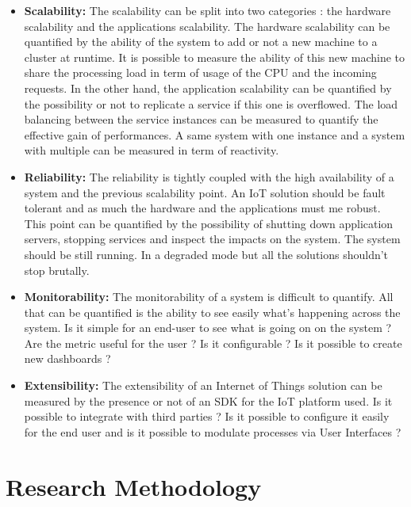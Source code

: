 \documentclass[11pt]{article}
\begin{document}
\begin{itemize}
	\item \textbf{Scalability:} The scalability can be split into two categories : the hardware scalability and the applications scalability. The hardware scalability can be quantified by the ability of the system to add or not a new machine to a cluster at runtime. It is possible to measure the ability of this new machine to share the processing load in term of usage of the CPU and the incoming requests. In the other hand, the application scalability can be quantified by the possibility or not to replicate a service if this one is overflowed. The load balancing between the service instances can be measured to quantify the effective gain of performances. A same system with one instance and a system with multiple can be measured in term of reactivity. 
	
	\item \textbf{Reliability:} The reliability is tightly coupled with the high availability of a system and the previous scalability point. An IoT solution should be fault tolerant and as much the hardware and the applications must me robust. This point can be quantified by the possibility of shutting down application servers, stopping services and inspect the impacts on the system. The system should be still running. In a degraded mode but all the solutions shouldn't stop brutally.

	\item \textbf{Monitorability:} The monitorability of a system is difficult to quantify. All that can be quantified is the ability to see easily what's happening across the system. Is it simple for an end-user to see what is going on on the system ? Are the metric useful for the user ? Is it configurable ? Is it possible to create new dashboards ?

	\item \textbf{Extensibility:} The extensibility of an Internet of Things solution can be measured by the presence or not of an SDK for the IoT platform used. Is it possible to integrate with third parties ? Is it possible to configure it easily for the end user and is it possible to modulate processes via User Interfaces ? 
	
\end{itemize}

\newpage


\section{Research Methodology} \label{research-methodology}
\end{document}
